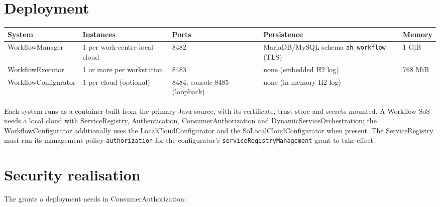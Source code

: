 \documentclass[a4paper]{arrowhead}
\begin{document}
\section{Deployment}
\label{sec:deployment}

{\small
\begin{longtable}{|p{3.2cm}|p{3.6cm}|p{3.0cm}|p{4.4cm}|p{1.6cm}|}

\hline
\rowcolor{gray!33} System & Instances & Ports & Persistence & Memory \\ \hline
\endhead
WorkflowManager & 1 per work-centre local cloud & 8482 & MariaDB/MySQL schema \texttt{ah\_workflow} (TLS) & 1 GiB \\ \hline
WorkflowExecutor & 1 or more per workstation & 8483 & none (embedded H2 log) & 768 MiB \\ \hline
WorkflowConfigurator & 1 per cloud (optional) & 8484, console 8485 (loopback) & none (in-memory H2 log) & -- \\ \hline
\end{longtable}
}

Each system runs as a container built from the primary Java source, with its certificate, trust store and secrets
mounted. A Workflow SoS needs a local cloud with ServiceRegistry, Authentication, ConsumerAuthorization and
DynamicServiceOrchestration; the WorkflowConfigurator additionally uses the LocalCloudConfigurator and the
SoLocalCloudConfigurator when present. The ServiceRegistry must run its management policy \texttt{authorization} for the
configurator's \texttt{serviceRegistryManagement} grant to take effect.

\section{Security realisation}
\label{sec:security}
The grants a deployment needs in ConsumerAuthorization:
\end{document}
